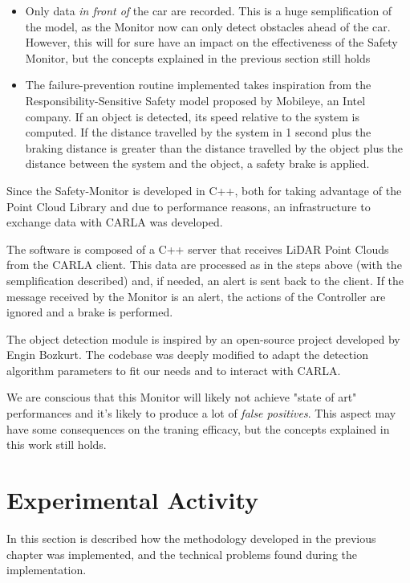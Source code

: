 \begin{itemize}
	\item Only data \textsl{in front of} the car are recorded. This is a huge semplification of the model, as the Monitor now can only detect obstacles ahead of the car. However, this will for sure have an impact on the effectiveness of the Safety Monitor, but the concepts explained in the previous section still holds
	\item The failure-prevention routine implemented takes inspiration from the Responsibility-Sensitive Safety model proposed by Mobileye, an Intel company.\cite{rss}
	If an object is detected, its speed relative to the system is computed. If the distance travelled by the system in 1 second  plus the braking distance is greater than the distance travelled by the object plus the distance between the system and the object, a safety brake is applied.
\end{itemize}

Since the Safety-Monitor is developed in C++, both for taking advantage of the Point Cloud Library and due to performance reasons, an infrastructure to exchange data with CARLA was developed.

The software is composed of a C++ server that receives LiDAR Point Clouds from the CARLA client. This data are processed as in the steps above (with the semplification described) and, if needed, an alert is sent back to the client. If the message received by the Monitor is an alert, the actions of the Controller are ignored and a brake is performed.

The object detection module is inspired by an open-source project developed by Engin Bozkurt\cite{LOD}. The codebase was deeply modified to adapt the detection algorithm parameters to fit our needs and to interact with CARLA.

We are conscious that this Monitor will likely not achieve "state of art" performances and it's likely to produce a lot of \textsl{false positives}. This aspect may have some consequences on the traning efficacy, but the concepts explained in this work still holds.

\section{Experimental Activity}

In this section is described how the methodology developed in the previous chapter was implemented, and the technical problems found during the implementation.

